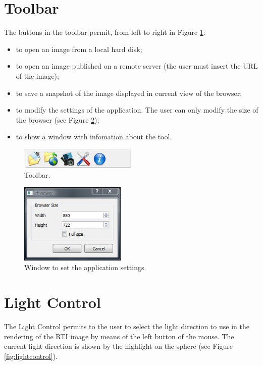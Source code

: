 \documentclass[oneside, 11pt]{book}
\begin{document}
\section{Toolbar}
The buttons in the toolbar permit, from left to right in Figure \ref{fig:toolbar}:
\begin{itemize}
\item to open an image from a local hard disk;
\item to open an image published on a remote server (the user must insert the URL of the image);
\item to save a snapshot of the image displayed in current view of the browser;
\item to modify the settings of the application. The user can only modify the size of the browser (see Figure \ref{fig:appSettings});
\item to show a window with infomation about the tool.  
\end{itemize}

\begin{figure}[hb!]
  \centering
  \includegraphics[width=0.5\textwidth]{toolbar}
  \caption{Toolbar.}
  \label{fig:toolbar}
\end{figure}

\begin{figure}[hb]
  \centering
  \includegraphics[width=0.45\textwidth]{app_settings}
  \caption{Window to set the application settings.}
  \label{fig:appSettings}
\end{figure}


\section{Light Control}
The Light Control permits to the user to select the light direction to use in the rendering of the RTI image by means of the left button of the mouse. The current light direction is shown by the highlight on the sphere (see Figure \ref{fig:lightcontrol}).
\end{document}
